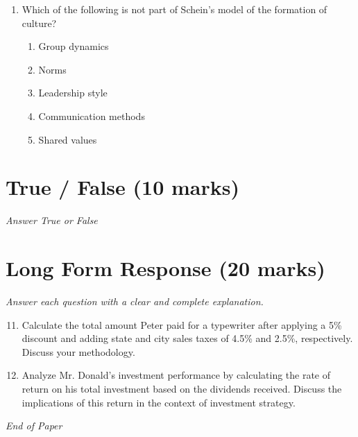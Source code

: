 \documentclass[12pt]{article}
\begin{document}
\begin{enumerate}[label=\arabic*.]
\begin{enumerate}[label=(\alph*)]
    \item Permissions.
    \item Social Media popularity.
    \item Website aesthetics.
    \item Digital literacy.
    \item Ownership.
\end{enumerate}
\item Which of the following is not part of Schein's model of the formation of culture?
\begin{enumerate}[label=(\alph*)]
    \item Group dynamics
    \item Norms
    \item Leadership style
    \item Communication methods
    \item Shared values
\end{enumerate}
\end{enumerate}

\section*{True / False (10 marks)}
\textit{Answer True or False}

\section*{Long Form Response (20 marks)}
\textit{Answer each question with a clear and complete explanation.}
\begin{enumerate}[label=\arabic*.]
\setcounter{enumi}{10}
\item Calculate the total amount Peter paid for a typewriter after applying a 5\% discount and adding state and city sales taxes of 4.5\% and 2.5\%, respectively. Discuss your methodology.
\item Analyze Mr. Donald's investment performance by calculating the rate of return on his total investment based on the dividends received. Discuss the implications of this return in the context of investment strategy.
\end{enumerate}

\vfill
\noindent\textit{End of Paper}
\end{document}
